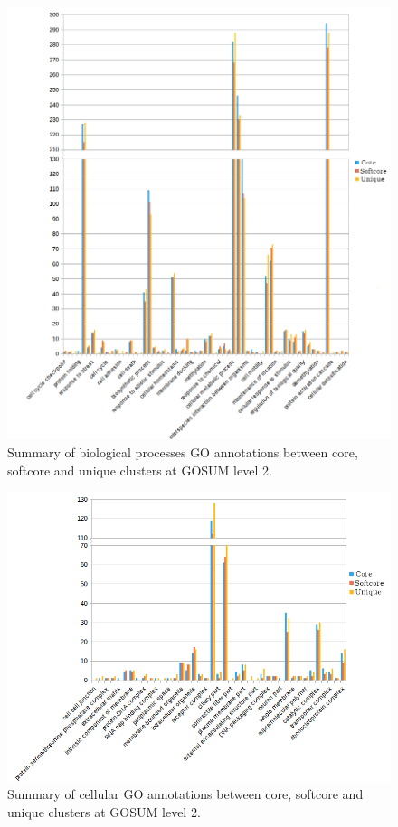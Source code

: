 \documentclass[12pt]{article}
\begin{document}
\begin{figure} 
\includegraphics[scale=.75]{3Aug18_cluster-investigation/figures/gosum-pan/Pan-gosum2-bio-split.png} 
\caption{Summary of biological processes GO annotations between core, softcore and unique clusters at GOSUM level 2.} 
\label{fig:PanGo2Bio}
\end{figure} 


\begin{figure} 
\includegraphics[scale=.8]{3Aug18_cluster-investigation/figures/gosum-pan/Pan-gosum2-cell-split.png} 
\caption{Summary of cellular GO annotations between core, softcore and unique clusters at GOSUM level 2.} 
\label{fig:PanGo2Cell}
\end{figure} 
\end{document}
